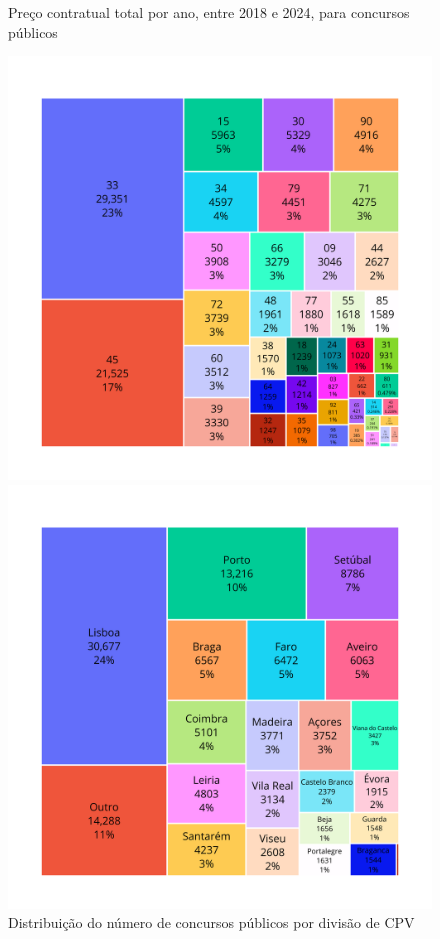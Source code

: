 \begin{figure}[H]
\begin{minipage}{.31\linewidth}
		\caption{Preço contratual total por ano, entre 2018 e 2024, para concursos públicos}
		\label{fig:precoad2}
	\end{minipage}
\end{figure}



\begin{figure}[H]
	\begin{minipage}[t]{.55\textwidth}
		\centering
		\includegraphics[width=\textwidth]{imagens/treemap_cpub.png}
		\caption{Distribuição do número de concursos públicos por divisão de CPV}
	\end{minipage}
	\begin{minipage}[t]{.55\textwidth}
		\centering
		\includegraphics[width=\textwidth]{imagens/treemap_cpub_distritos.png}

\end{minipage}
\end{figure}
